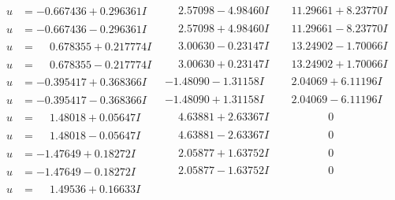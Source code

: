 \documentclass[1p]{elsarticle_modified}
\theoremstyle{definition}
\begin{document}
$$\begin{array}{c|c|c}
\begin{aligned}
u &= -0.667436 + 0.296361 I\end{aligned}
 & \phantom{-}2.57098 - 4.98460 I & \phantom{-}11.29661 + 8.23770 I \\ \hline\begin{aligned}
u &= -0.667436 - 0.296361 I\end{aligned}
 & \phantom{-}2.57098 + 4.98460 I & \phantom{-}11.29661 - 8.23770 I \\ \hline\begin{aligned}
u &= \phantom{-}0.678355 + 0.217774 I\end{aligned}
 & \phantom{-}3.00630 - 0.23147 I & \phantom{-}13.24902 - 1.70066 I \\ \hline\begin{aligned}
u &= \phantom{-}0.678355 - 0.217774 I\end{aligned}
 & \phantom{-}3.00630 + 0.23147 I & \phantom{-}13.24902 + 1.70066 I \\ \hline\begin{aligned}
u &= -0.395417 + 0.368366 I\end{aligned}
 & -1.48090 - 1.31158 I & \phantom{-}2.04069 + 6.11196 I \\ \hline\begin{aligned}
u &= -0.395417 - 0.368366 I\end{aligned}
 & -1.48090 + 1.31158 I & \phantom{-}2.04069 - 6.11196 I \\ \hline\begin{aligned}
u &= \phantom{-}1.48018 + 0.05647 I\end{aligned}
 & \phantom{-}4.63881 + 2.63367 I & \phantom{-0.000000 } 0 \\ \hline\begin{aligned}
u &= \phantom{-}1.48018 - 0.05647 I\end{aligned}
 & \phantom{-}4.63881 - 2.63367 I & \phantom{-0.000000 } 0 \\ \hline\begin{aligned}
u &= -1.47649 + 0.18272 I\end{aligned}
 & \phantom{-}2.05877 + 1.63752 I & \phantom{-0.000000 } 0 \\ \hline\begin{aligned}
u &= -1.47649 - 0.18272 I\end{aligned}
 & \phantom{-}2.05877 - 1.63752 I & \phantom{-0.000000 } 0 \\ \hline\begin{aligned}
u &= \phantom{-}1.49536 + 0.16633 I\end{aligned}

\end{array}$$
\end{document}
